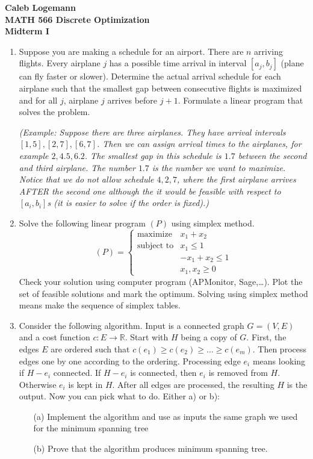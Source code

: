 \documentclass[11pt, oneside]{article}
\begin{document}
\noindent \textbf{\Large{Caleb Logemann \\
MATH 566 Discrete Optimization\\
Midterm I
}}

%
\begin{enumerate}
  \item %
    Suppose you are making a schedule for an airport.
    There are $n$ arriving flights. Every airplane $j$ has a possible time arrival  in interval $[a_j,b_j]$
    (plane can fly faster or slower). 
    Determine the actual arrival schedule for each airplane such that the smallest gap between consecutive flights is maximized
    and for all  $j$, airplane $j$ arrives before $j+1$.
    Formulate a linear program that solves the problem.

    \emph{
      (Example: Suppose there are three airplanes. They have arrival intervals $[1,5],[2,7],[6,7]$.
      Then we can assign arrival times to the airplanes, for example $2,4.5,6.2$. The smallest
      gap in this schedule is $1.7$ between the second and third airplane. The number $1.7$
      is the number we want to maximize. Notice that we do not allow schedule $4,2,7$, where the first
      airplane arrives AFTER the second one although the it would be feasible with respect to $[a_i,b_i]$s
      (it is easier to solve if the order is fixed).)
    }

  \item %
    Solve the following linear program $(P)$ using simplex method.
    \[
    (P) = 
    \begin{cases}
    \text{maximize}  &x_1+x_2 \\
    \text{subject to}  & x_1 \leq 1 \\
                              & -x_1 + x_2 \leq 1 \\
                              & x_1,x_2 \geq 0
    \end{cases}
    \]
    Check your solution using computer program (APMonitor, Sage,\ldots).
    Plot the set of feasible solutions and mark the optimum.
    Solving using simplex method means make the sequence of simplex tables.

  \item %
    Consider the following algorithm. Input is a connected graph $G=(V,E)$ and
    a cost function $c:E \rightarrow \mathbb{R}$.
    Start with $H$ being a copy of $G$.
    First, the edges $E$ are ordered such that
    $c(e_1) \geq c(e_2) \geq \ldots \geq c(e_m)$.
    Then process edges one by one according to the ordering.
    Processing edge $e_i$ means looking if $H-e_i$ connected.
    If $H-e_i$ is connected, then $e_i$ is removed from $H$.
    Otherwise $e_i$ is kept in $H$.
    After all edges are processed, the resulting $H$ is the output.
    Now you can pick what to do.
    Either a) or b):
    \begin{enumerate}
      \item[(a)]
        Implement the algorithm and use as inputs the same graph we used for the minimum spanning tree
      \item[(b)]
        Prove that the algorithm produces minimum spanning tree.
    \end{enumerate}


\end{enumerate}
\end{document}
